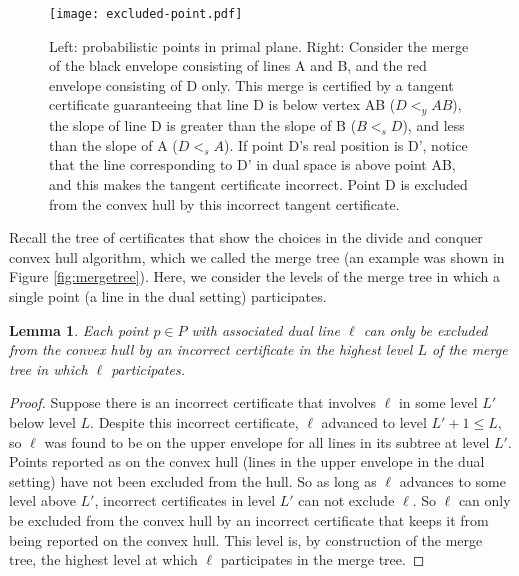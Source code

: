 \documentclass[11pt]{article}
\newtheorem{lemma}{\textbf{Lemma}}[section]
\begin{document}
\begin{figure}[h]  
\begin{center}
\texttt{[image: excluded-point.pdf]}
\end{center}
\caption{Left: probabilistic points in primal plane. Right: Consider the merge of the black envelope consisting of lines A and B, and the red envelope consisting of D only. This merge is certified by a tangent certificate guaranteeing that line D is below vertex AB ($D <_y AB$), the slope of line D is greater than the slope of B ($B <_s D$), and less than the slope of A ($D <_s A$). If point D's real position is D', notice that the line corresponding to D' in dual space is above point AB, and this makes the tangent certificate incorrect. Point D is excluded from the convex hull by this incorrect tangent certificate.}

\label{fig:excluded point}
\end{figure}
Recall the tree of certificates that show the choices in the divide and conquer convex hull algorithm, which we called the merge tree (an example was shown in Figure \ref{fig:mergetree}).  
Here, we consider the levels of the merge tree in which a single point (a line in the dual setting) participates.


\begin{lemma}
\label{lem:highest_level}
Each point $p \in P$ with associated dual line $\ell$ can only be excluded from the convex hull by an incorrect certificate in the highest level $L$ of the merge tree in which $\ell$ participates.
\end{lemma}

\begin{proof}
   Suppose there is an incorrect certificate that involves $\ell$ in some level $L'$ below level $L$.  Despite this incorrect certificate, $\ell$ advanced to level $L' + 1 \leq L$, so $\ell$ was found to be on the upper envelope for all lines in its subtree at level $L'$.  Points reported as on the convex hull (lines in the upper envelope in the dual setting) have not been excluded from the hull.  So as long as $\ell$ advances to some level above $L'$, incorrect certificates in level $L'$ can not exclude $\ell$.  So $\ell$ can only be excluded from the convex hull by an incorrect certificate that keeps it from being reported on the convex hull.  This level is, by construction of the merge tree, the highest level at which $\ell$ participates in the merge tree.
\end{proof}
\end{document}
